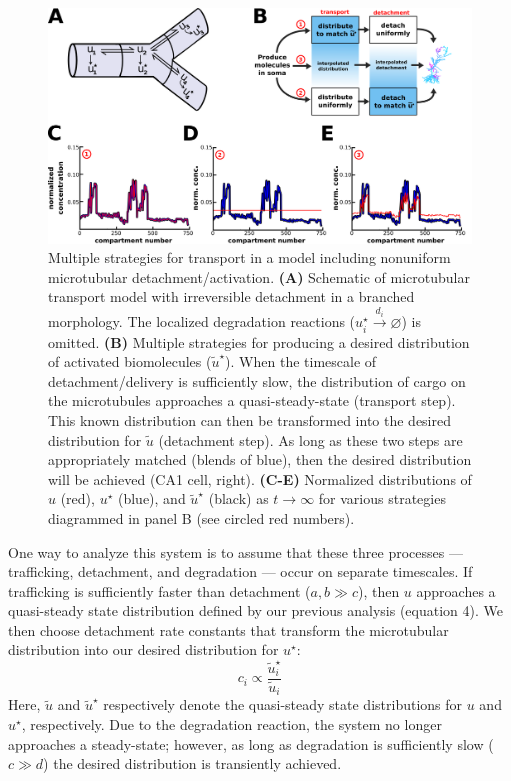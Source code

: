 \documentclass[10pt]{wlpeerj}
\begin{document}
\begin{figure}[!tb]
\begin{center}
\includegraphics[width=0.9\columnwidth]{04_sushi_belt.png}
\caption{Multiple strategies for transport in a model including nonuniform microtubular detachment/activation.
\textbf{(A)} Schematic of microtubular transport model with irreversible detachment in a branched morphology. The localized degradation reactions ($u^{\star}_i \xrightarrow{d_i} \varnothing$) is omitted.
\textbf{(B)} Multiple strategies for producing a desired distribution of activated biomolecules ($\tilde{u}^{\star}$). When the timescale of detachment/delivery is sufficiently slow, the distribution of cargo on the microtubules approaches a quasi-steady-state (transport step). This known distribution can then be transformed into the desired distribution for $\tilde{u}$ (detachment step). As long as these two steps are appropriately matched (blends of blue), then the desired distribution will be achieved (CA1 cell, right).
\textbf{(C-E)} Normalized distributions of $u$ (red), $u^\star$ (blue), and $\tilde{u}^\star$ (black) as $t \rightarrow \infty$ for various strategies diagrammed in panel B (see circled red numbers). }
\end{center}
\end{figure}

One way to analyze this system is to assume that these three processes --- trafficking, detachment, and degradation --- occur on separate timescales.
If trafficking is sufficiently faster than detachment ($a,b \gg c$), then $u$ approaches a quasi-steady state distribution defined by our previous analysis (equation 4).
We then choose detachment rate constants that transform the microtubular distribution into our desired distribution for $u^\star$:
\begin{equation}
c_i \propto \frac{\tilde{u}^\star_i}{\tilde{u}_i}
\end{equation}
Here, $\tilde{u}$ and $\tilde{u}^\star$ respectively denote the quasi-steady state distributions for $u$ and $u^\star$, respectively.
Due to the degradation reaction, the system no longer approaches a steady-state; however, as long as degradation is sufficiently slow ($c \gg d$) the desired distribution is transiently achieved.
\end{document}

